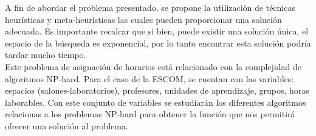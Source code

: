\label{sec:introduccion}

A fin de abordar el problema presentado, se propone la utilización de técnicas heurísticas y meta-heurísticas las cuales pueden proporcionar una solución adecuada. Es importante recalcar que si bien, puede existir una solución única, el espacio de la búsqueda es exponencial, por lo tanto encontrar esta solución podría tardar mucho tiempo. \\

Este problema de asignación de horarios está relacionado con la complejidad de algoritmos NP-hard. Para el caso de la ESCOM, se cuentan con las variables: espacios (salones-laboratorios), profesores, unidades de aprendizaje, grupos, horas laborables. Con este conjunto de variables se estudiarán los diferentes algoritmos relacionas a los problemas NP-hard para obtener la función que nos permitirá ofrecer una solución al problema.
